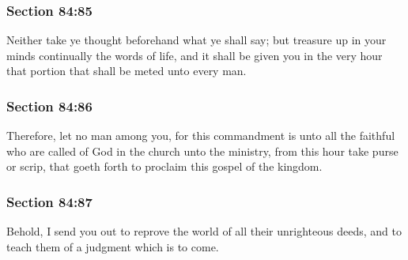	\subsubsection{Section 84:85} %
		\label{DC84-85}

		Neither take ye thought beforehand what ye shall say; but treasure up in your minds continually the words of life, and it shall be given you in the very hour that portion that shall be meted unto every man.


	\subsubsection{Section 84:86} %
		\label{DC84-86}

		Therefore, let no man among you, for this commandment is unto all the faithful who are called of God in the church unto the ministry, from this hour take purse or scrip, that goeth forth to proclaim this gospel of the kingdom.


	\subsubsection{Section 84:87} %
		\label{DC84-87}

		Behold, I send you out to reprove the world of all their unrighteous deeds, and to teach them of a judgment which is to come.


